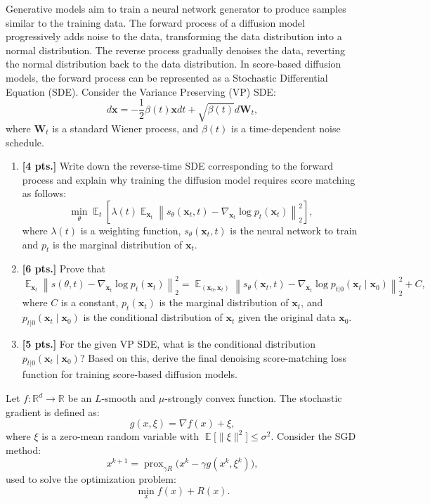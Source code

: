 \documentclass[11pt,a4paper]{article}
\DeclareMathOperator{\E}{\mathbb{E}}
\DeclareMathOperator{\prox}{prox}
\newcommand{\examstatement}[1]{%
  \par\addvspace{0.85em}%
  \noindent{\bfseries #1}\par\nobreak\addvspace{0.28em}%
}
\theoremstyle{definition}
\begin{document}
\examstatement{Problem 2. [15 pts.]}
Generative models aim to train a neural network generator to produce samples similar to the training data. The forward process of a diffusion model progressively adds noise to the data, transforming the data distribution into a normal distribution. The reverse process gradually denoises the data, reverting the normal distribution back to the data distribution. In score-based diffusion models, the forward process can be represented as a Stochastic Differential Equation (SDE). Consider the Variance Preserving (VP) SDE:
\[
d\mathbf{x} = -\frac{1}{2}\beta(t)\mathbf{x} dt + \sqrt{\beta(t)} d\mathbf{W}_t,
\]
where $\mathbf{W}_t$ is a standard Wiener process, and $\beta(t)$ is a time-dependent noise schedule.
\begin{enumerate}[label=(\alph*)]
    \item \textbf{[4 pts.]} Write down the reverse-time SDE corresponding to the forward process and explain why training the diffusion model requires score matching as follows:
    \[
    \min_{\theta} \E_t \left[ \lambda(t) \E_{\mathbf{x}_t} \left\| s_\theta(\mathbf{x}_t, t) - \nabla_{\mathbf{x}_t} \log p_t(\mathbf{x}_t) \right\|_2^2 \right],
    \]
    where $\lambda(t)$ is a weighting function, $s_\theta(\mathbf{x}_t, t)$ is the neural network to train and $p_t$ is the marginal distribution of $\mathbf{x}_t$.
    \item \textbf{[6 pts.]} Prove that
    \[
    \E_{\mathbf{x}_t} \left\| s(\theta, t) - \nabla_{\mathbf{x}_t} \log p_t(\mathbf{x}_t) \right\|_2^2 = \E_{(\mathbf{x}_0, \mathbf{x}_t)} \left\| s_\theta(\mathbf{x}_t, t) - \nabla_{\mathbf{x}_t} \log p_{t|0}(\mathbf{x}_t \mid \mathbf{x}_0) \right\|_2^2 + C,
    \]
    where $C$ is a constant, $p_t(\mathbf{x}_t)$ is the marginal distribution of $\mathbf{x}_t$, and $p_{t|0}(\mathbf{x}_t \mid \mathbf{x}_0)$ is the conditional distribution of $\mathbf{x}_t$ given the original data $\mathbf{x}_0$.
    \item \textbf{[5 pts.]} For the given VP SDE, what is the conditional distribution $p_{t|0}(\mathbf{x}_t \mid \mathbf{x}_0)$? Based on this, derive the final denoising score-matching loss function for training score-based diffusion models.
\end{enumerate}

\par

Let $f : \mathbb{R}^d \to \mathbb{R}$ be an $L$-smooth and $\mu$-strongly convex function. The stochastic gradient is defined as:
\[
g(x, \xi) = \nabla f(x) + \xi,
\]
where $\xi$ is a zero-mean random variable with $\E \bigl[ \|\xi\|^2 \bigr] \le \sigma^2$. Consider the SGD method:
\[
x^{k+1} = \prox_{\gamma R} \bigl( x^k - \gamma g(x^k, \xi^k) \bigr),
\]
used to solve the optimization problem:
\[
\min_{x} f(x) + R(x).
\]
\end{document}
